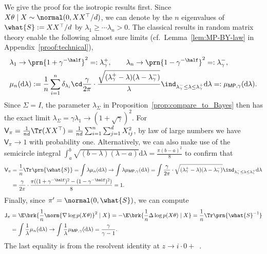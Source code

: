 \documentclass[11pt]{article}
\newcommand{\de}{\mathrm{d}}
\newcommand{\jfunc}{\mathsf{J}}
\begin{document}
We give the proof for the isotropic results first. Since $X\theta\mid X \sim \normal(0, XX^\top /d )$, we can denote by the $n$ eigenvalues of $\what{S}:=XX^\top/d$ by $\lambda_1 \geq \cdots \lambda_n > 0$. The classical results in random matrix theory enable the following almost sure limits (cf.~Lemma~\ref{lem:MP-BY-law} in Appendix~\ref{proof:technical}),
\begin{align*}
    &\lambda_1 \to  \prn{1 + \gamma^{-\half}}^2  =: \lambda^+_\gamma, \qquad \lambda_n \to   \prn{1 - \gamma^{-\half}}^2 =:\lambda^-_\gamma, \\
    &\mu_n(\de \lambda) := \frac{1}{n} \sum_{i=1}^n \delta_{\lambda_i} \cd\frac{\gamma}{2\pi} \cdot \frac{\sqrt{(\lambda^+_\gamma-\lambda)(\lambda - \lambda^-_\gamma)}}{\lambda} \ind_{\lambda^-_\gamma \leq \lambda \leq \lambda^+_\gamma} \de \lambda =: \mu_{\mathsf{MP}, \gamma}(\de \lambda). 
\end{align*}
Since $\Sigma = I$, the parameter $\lambda_\Sigma$ in Proposition~\ref{prop:compare_to_Bayes} then has the exact limit $\lambda_\Sigma = \gamma \lambda_1 \to (1 + \sqrt{\gamma})^2$. For $\mathsf{V}_{\pi} = \frac{1}{nd}\Tr(XX^\top) = \frac{1}{nd} \sum_{i=1}^n \sum_{j=1}^d X_{ij}^2$, by law of large numbers we have $\mathsf{V}_{\pi} \to 1$ with probability one. Alternatively, we can also make use of the semicircle integral $\int_a^b \sqrt{(b-\lambda)(\lambda-a)} \de \lambda = \frac{\pi(b-a)^2}{8}$ to confirm that
\begin{align*}
    \mathsf{V}_{\pi} & = \frac{1}{n}\Tr \prn{\what{S}} = \int \lambda \mu_n(\de \lambda) \to \int \lambda \mu_{\mathsf{MP}, \gamma}(\de \lambda)  = \int \frac{\gamma}{2\pi} \cdot \sqrt{(\lambda^+_\gamma-\lambda)(\lambda - \lambda^-_\gamma)}\ind_{\lambda^-_\gamma \leq \lambda \leq \lambda^+_\gamma} \de \lambda \nonumber \\
    & = \frac{\gamma}{2\pi} \cdot \frac{\pi ((1+\gamma^{-\half})^2- (1-\gamma^{-\half})^2)}{8} = 1.
\end{align*}
Finally, since $\pi' = \normal(0, \what{S})$, we can compute
\begin{align*}
    \jfunc_{\pi} & = \E \brk{\frac{1}{n}\norm{\nabla \log p(X\theta)}^2\mid X} = -\E \brk{\frac{1}{n} \Delta \log p(X\theta) \mid X} = \frac{1}{n} \Tr \prn{\what{S}^{-1}} \nonumber \\
    & = \int \frac{1}{\lambda} \mu_n(\de \lambda) \to \int \frac{1}{\lambda} \mu_{\mathsf{MP}, \gamma}(\de \lambda) = \frac{\gamma}{\gamma-1}.
\end{align*}
The last equality is from the resolvent identity at $z \to i\cdot0+$~\cite[Lemma~3.11]{bai2010spectral}.
\end{document}
